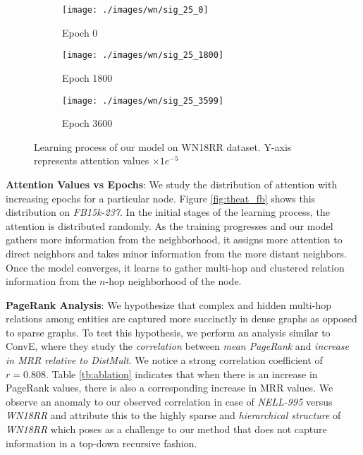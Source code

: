 \documentclass[11pt,a4paper]{article}
\begin{document}
\begin{figure*}[t]
  \centering
  \hspace{-1.9cm}
  \begin{subfigure}[b]{0.2\linewidth}\label{hwn:a}
    \texttt{[image: ./images/wn/sig\_25\_0]}
    \caption{Epoch 0}
  \end{subfigure}
  \hspace{2.1cm}
  \begin{subfigure}[b]{0.2\linewidth}\label{hwn:c}
    \texttt{[image: ./images/wn/sig\_25\_1800]}
    \caption{Epoch 1800}
  \end{subfigure}
  \hspace{2.1cm}
  \begin{subfigure}[b]{0.2\linewidth}\label{hwn:e}
    \texttt{[image: ./images/wn/sig\_25\_3599]}
    \caption{Epoch 3600}
  \end{subfigure}
  \caption{Learning process of our model on WN18RR dataset. Y-axis represents attention values \(\times 1e^{-5}\) }
  \label{fig:theat_wn}
\end{figure*}

\noindent\textbf{Attention Values vs Epochs}: We study the distribution of attention with increasing epochs for a particular node. 
Figure \ref{fig:theat_fb} shows this distribution on \emph{FB15k-237}. In the initial stages of the learning process, the attention is distributed randomly. As the training progresses and our model gathers more information from the neighborhood, it assigns more attention to direct neighbors and takes minor information from the more distant neighbors. Once the model converges, it learns to gather multi-hop and clustered relation information from the $n$-hop neighborhood of the node.

\noindent\textbf{PageRank Analysis}:
We hypothesize that complex and hidden multi-hop relations among entities are captured more succinctly in dense graphs as opposed to sparse graphs. 
To test this hypothesis, we perform an analysis similar to ConvE, where they study the \emph{correlation} between \emph{mean PageRank} and \emph{increase in MRR relative to DistMult}. 
We notice a strong correlation coefficient of 
\(r = 0.808\). Table \ref{tb:ablation} indicates that when there is an increase in PageRank values, there is also a corresponding increase in MRR values.
We observe an anomaly to our observed correlation in case of \emph{NELL-995} versus \emph{WN18RR}
and attribute this to the highly sparse and \emph{hierarchical structure} of \emph{WN18RR} which poses as a challenge to our method that does not capture information in a top-down recursive fashion. 
\end{document}
